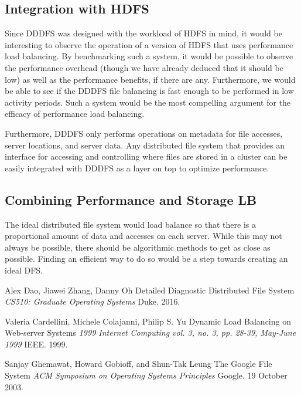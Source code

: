 \documentclass[twoside]{article}
\begin{document}
\begin{multicols}{2}
\subsection*{Integration with HDFS}
Since DDDFS was designed with the workload of HDFS in mind, it would be interesting to observe the operation of a version of HDFS that uses performance load balancing. By benchmarking such a system, it would be possible to observe the performance overhead (though we have already deduced that it should be low) as well as the performance benefits, if there are any. Furthermore, we would be able to see if the DDDFS file balancing is fast enough to be performed in low activity periods. Such a system would be the most compelling argument for the efficacy of performance load balancing.

Furthermore, DDDFS only performs operations on metadata for file accesses, server locations, and server data. Any distributed file system that provides an interface for accessing and controlling where files are stored in a cluster can be easily integrated with DDDFS as a layer on top to optimize performance.

\subsection*{Combining Performance and Storage LB}
The ideal distributed file system would load balance so that there is a proportional amount of data and accesses on each server. While this may not always be possible, there should be algorithmic methods to get as close as possible. Finding an efficient way to do so would be a step towards creating an ideal DFS.

\begin{thebibliography}{99} %
 Alex Dao, Jiawei Zhang, Danny Oh
\newblock Detailed Diagnostic Distributed File System
\newblock \textit{CS510: Graduate Operating Systems}
\newblock Duke. 2016.

 Valeria Cardellini, Michele Colajanni, Philip S. Yu
\newblock Dynamic Load Balancing on Web-server Systems
\newblock \textit{1999 Internet Computing vol. 3, no. 3, pp. 28-39, May-June 1999}
\newblock IEEE. 1999.

 Sanjay Ghemawat, Howard Gobioff, and Shun-Tak Leung
\newblock The Google File System
\newblock \textit{ACM Symposium on Operating Systems Principles}
\newblock Google. 19 October 2003.


\end{thebibliography}
\end{multicols}
\end{document}
